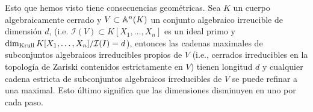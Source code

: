 \documentclass[../main.tex]{subfiles}
\begin{document}
Esto que hemos visto tiene consecuencias geométricas. Sea $K$ un cuerpo algebraicamente cerrado y $V\subset \mathbb{A}^n(K)$ un conjunto algebraico irreucible de dimensión $d$, (i.e. $\mathcal{I}(V)\subset K[X_1,\dots,X_n]$ es un ideal primo y $\dim_{\text{Krull}}{K[X_1,\dots,X_n]/\mathcal{I}(I)}=d$), entonces las cadenas maximales de subconjuntos algebraicos irreducibles propios de $V$ (i.e., cerrados irreducibles en la topología de Zariski contenidos estrictamente en $V$) tienen longitud $d$ y cualquier cadena estricta de subconjuntos algebraicos irreducibles de $V$ se puede refinar a una maximal. Esto último significa que las dimensiones disminuyen en uno por cada paso.
\end{document}

